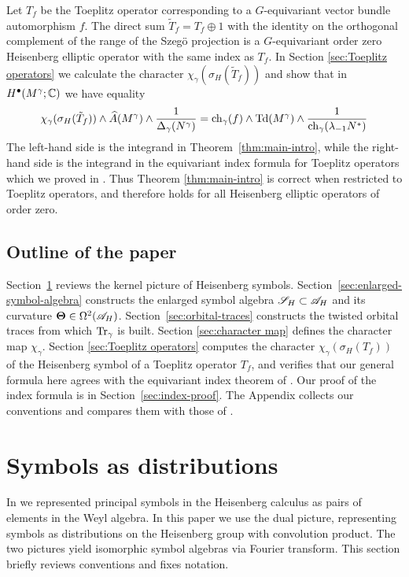 \documentclass[11pt]{amsart}
\theoremstyle{plain}
\theoremstyle{definition}
\theoremstyle{remark}
\begin{document}
Let $T_f$ be the Toeplitz operator corresponding to a $G$-equivariant vector bundle automorphism $f$.
The direct sum  $\tilde T_f=T_f\oplus 1$  with the identity on the orthogonal complement of the range of the Szeg\"{o} projection is a $G$-equivariant order zero Heisenberg elliptic operator with the same index as $T_f$.
In Section \ref{sec:Toeplitz operators} we calculate the character $\chi_\gamma(\sigma_H(\tilde T_f))$ and show that in $H^\bullet(M^\gamma;{\mathbb{C}})$ we have equality
\[
 \chi_\gamma(\sigma_H(\tilde T_f))\wedge \widehat{A}(M^\gamma)\wedge \frac{1}{\Delta_\gamma(N^\gamma)}
 =\operatorname{ch}_\gamma(f)\wedge
   \operatorname{Td}(M^\gamma)\wedge \frac{1}{\operatorname{ch}_\gamma(\lambda_{-1}N^*)}
\]
The left-hand side is the integrand in Theorem~\ref{thm:main-intro}, while the right-hand side is the integrand in the equivariant index formula for Toeplitz operators  which we proved in \cite{GvE26}.
Thus Theorem \ref{thm:main-intro} is correct when restricted to Toeplitz operators, and therefore holds for all Heisenberg elliptic operators of order zero.

\subsection{Outline of the paper}
Section~\ref{sec:symbols} reviews the kernel picture of Heisenberg symbols.
Section~\ref{sec:enlarged-symbol-algebra} constructs the enlarged  symbol algebra ${\mathscr{S}_H}\subset {\mathscr{A}}_H$ and its curvature $\boldsymbol{\Theta}\in\Omega^2({\mathscr{A}}_H)$.
Section~\ref{sec:orbital-traces} constructs the twisted orbital traces from which $\operatorname{Tr}_\gamma$ is built.
Section \ref{sec:character map} defines  the character map $\chi_\gamma$. 
Section \ref{sec:Toeplitz operators} computes the character $\chi_\gamma(\sigma_H(T_f))$ of the Heisenberg symbol of a Toeplitz operator $T_f$, and verifies that our general formula here agrees with the equivariant index theorem of \cite{GvE26}.
Our proof of the index formula is in Section~\ref{sec:index-proof}.
The Appendix collects our conventions and compares them with those of \cite{GvE20,GvE25,GvE26}.









\section{Symbols as distributions}\label{sec:symbols}
In \cite{GvE20} we represented principal symbols in the Heisenberg calculus as pairs of elements in the Weyl algebra.
In this paper we use the dual picture, representing symbols as distributions on the Heisenberg group with convolution product.
The two pictures yield isomorphic symbol algebras via Fourier transform.
This section briefly reviews conventions and fixes notation.
\end{document}
